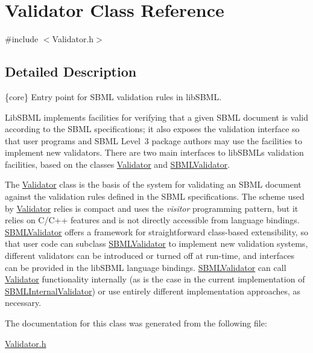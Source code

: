 \hypertarget{class_validator}{}\section{Validator Class Reference}
\label{class_validator}


{\ttfamily \#include $<$Validator.\+h$>$}



\subsection{Detailed Description}
\{core\} Entry point for S\+B\+ML validation rules in lib\+S\+B\+ML.



Lib\+S\+B\+ML implements facilities for verifying that a given S\+B\+ML document is valid according to the S\+B\+ML specifications; it also exposes the validation interface so that user programs and S\+B\+ML Level~3 package authors may use the facilities to implement new validators. There are two main interfaces to lib\+S\+B\+ML\textquotesingle{}s validation facilities, based on the classes \hyperlink{class_validator}{Validator} and \hyperlink{class_s_b_m_l_validator}{S\+B\+M\+L\+Validator}.

The \hyperlink{class_validator}{Validator} class is the basis of the system for validating an S\+B\+ML document against the validation rules defined in the S\+B\+ML specifications. The scheme used by \hyperlink{class_validator}{Validator} relies is compact and uses the {\itshape visitor} programming pattern, but it relies on C/\+C++ features and is not directly accessible from language bindings. \hyperlink{class_s_b_m_l_validator}{S\+B\+M\+L\+Validator} offers a framework for straightforward class-\/based extensibility, so that user code can subclass \hyperlink{class_s_b_m_l_validator}{S\+B\+M\+L\+Validator} to implement new validation systems, different validators can be introduced or turned off at run-\/time, and interfaces can be provided in the lib\+S\+B\+ML language bindings. \hyperlink{class_s_b_m_l_validator}{S\+B\+M\+L\+Validator} can call \hyperlink{class_validator}{Validator} functionality internally (as is the case in the current implementation of \hyperlink{class_s_b_m_l_internal_validator}{S\+B\+M\+L\+Internal\+Validator}) or use entirely different implementation approaches, as necessary. 

The documentation for this class was generated from the following file\+:\begin{DoxyCompactItemize}
\item 
\hyperlink{_validator_8h}{Validator.\+h}\end{DoxyCompactItemize}

